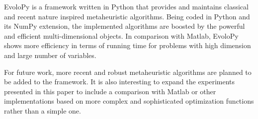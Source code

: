 \documentclass[a4paper,twoside]{article}
\begin{document}
EvoloPy is a framework written in Python that provides and maintains classical and recent nature inspired metaheuristic algorithms. Being coded in Python and its NumPy extension, the implemented algorithms are boosted by the powerful and efficient multi-dimensional objects. In comparison with Matlab, EvoloPy shows more efficiency in terms of running time for problems with  high dimension and large number of variables. 

For future work, more recent and robust metaheuristic algorithms are planned to be added to the framework. It is also interesting to expand the experiments presented in this paper to include a comparison with Matlab or other implementations based on more complex and sophisticated optimization functions rather than a simple one. 





{\small
}
\end{document}
